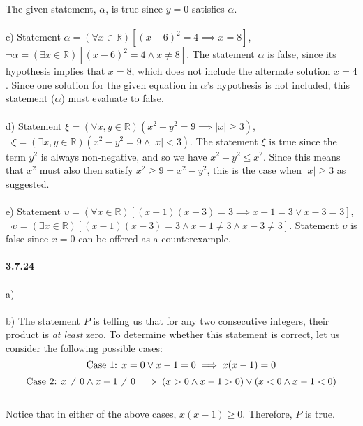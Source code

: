 \documentclass[12pt]{article}
\begin{document}
The given statement, $\alpha$, is true since $y = 0$ satisfies $\alpha$.\\\\
c)
Statement $\alpha = (\forall x \in \mathbb{R})[(x-6)^2 = 4 \implies x = 8]$, \quad $\neg \alpha = (\exists x \in \mathbb{R})[(x-6)^2 = 4 \land x \neq 8]$. 
The statement $\alpha$ is false, since its hypothesis implies that $x = 8$, which does not include the alternate solution $x = 4$. 
Since one solution for the given equation in $\alpha$'s hypothesis is not included, this statement ($\alpha$)  must evaluate to false.\\\\
d)
Statement $\xi = (\forall x, y \in \mathbb{R})(x^2-y^2 = 9 \implies |x| \geq 3)$, \quad $\neg \xi = (\exists x, y \in \mathbb{R})(x^2 - y^2 = 9 \land |x| < 3)$. 
The statement $\xi$ is true since the term $y^2$ is always non-negative, and so we have $x^2-y^2 \leq x^2$. Since this means that $x^2$ must also then satisfy $x^2 \geq 9 = x^2 - y^2$, this is the case when $|x| \geq 3$ as suggested.\\\\
e)
Statement $\upsilon = (\forall x \in \mathbb{R})[(x-1)(x-3)=3 \implies x-1=3 \lor x-3=3]$, \quad $\neg \upsilon = (\exists x \in \mathbb{R})[(x-1)(x-3)=3 \land x-1 \neq 3 \land x-3 \neq 3]$. 
Statement $\upsilon$ is false since $x=0$ can be offered as a counterexample.\\\\
\textbf{3.7.24}\\\\
a)
\\\\
b)
The statement $P$ is telling us that for any two consecutive integers, their product is \emph{at least} zero. 
To determine whether this statement is correct, let us consider the following possible cases: 
$$\textnormal{Case 1: } x=0 \lor x-1=0 \implies x(x-1) = 0$$
$$\textnormal{Case 2: } x \neq 0 \land x-1 \neq 0 \implies (x > 0 \land x-1 > 0) \lor (x < 0 \land x-1 < 0)$$\\
Notice that in either of the above cases, $x(x-1) \geq 0$. Therefore, $P$ is true.\\\\
\end{document}
